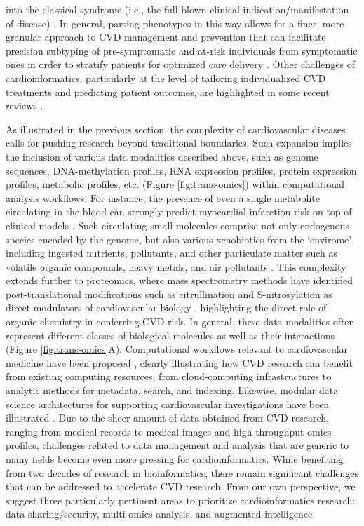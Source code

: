 \documentclass[letter]{bib}
\begin{document}
into the classical syndrome (i.e., the full-blown clinical indication/manifestation of disease) \citep{Cranley:2018:New}.  In general, parsing phenotypes in this way allows for a finer, more granular approach to CVD management and prevention that can facilitate precision subtyping of pre-symptomatic and at-risk individuals from symptomatic ones in order to stratify patients for optimized care delivery \citep{Johnson:2017:Enabling}.  Other challenges of cardioinformatics, particularly at the level of tailoring individualized CVD treatments and predicting patient outcomes, are highlighted in some recent reviews \cite{Meder:2016:Computational,Niederer:2019:Computational,Trayanova:2019:From}.     
	
	As illustrated in the previous section, the complexity of cardiovascular diseases calls for pushing research beyond traditional boundaries.
	Such expansion implies the inclusion of various data modalities described above, such as genome sequences, DNA-methylation profiles, RNA expression profiles, protein expression profiles, metabolic profiles, etc. (Figure \ref{fig:trans-omics}) within computational analysis workflows.  For instance, the presence of even a single metabolite circulating in the blood can strongly predict myocardial infarction risk on top of clinical models \citep{mcgarrah:2018:cardiovascular}.  Such circulating small molecules comprise not only endogenous species encoded by the genome, but also various xenobiotics from the `envirome', including ingested nutrients, pollutants, and other particulate matter such as volatile organic compounds, heavy metals, and air pollutants \citep{Lau:2018:Omics,Riggs:2018:Defining,Brook:2010:Particulate}.  This complexity extends further to proteomics, where mass spectrometry methods have identified post-translational modifications such as citrullination and S-nitrosylation as direct modulators of cardiovascular biology \citep{Fert-Bober:2018:Precision}, highlighting the direct role of organic chemistry \citep{McMahon:2017:Survival} in conferring CVD risk.  In general, these data modalities often represent different classes of biological molecules as well as their interactions (Figure \ref{fig:trans-omics}A). Computational workflows relevant to cardiovascular medicine have been proposed \citep{Ping:2018:Biomedical}, clearly illustrating how CVD research can benefit from existing computing resources, from cloud-computing infrastructures to analytic methods for metadata, search, and indexing. Likewise, modular data science architectures for supporting cardiovascular investigations have been illustrated \citep{Khomtchouk:2019:HeartBioPortal,Scruggs:2015:harnessing}.  Due to the sheer amount of data obtained from CVD research, ranging from medical records to medical images and high-throughput omics profiles, challenges related to data management and analysis that are generic to many fields become even more pressing for cardioinformatics. While benefiting from two decades of research in bioinformatics, there remain significant challenges that can be addressed to accelerate CVD research. From our own perspective, we suggest three particularly pertinent areas to prioritize cardioinformatics research: data sharing/security, multi-omics analysis, and augmented intelligence.
	
\end{document}
